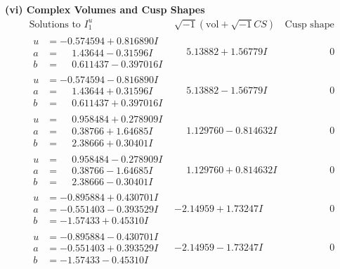 \documentclass[1p]{elsarticle_modified}
\theoremstyle{definition}
\newcommand{\I}{\sqrt{-1}}
\begin{document}
\newpage\flushleft \textbf{(vi) Complex Volumes and Cusp Shapes}
$$\begin{array}{c|c|c}  
\text{Solutions to }I^u_{1}& \I (\text{vol} + \sqrt{-1}CS) & \text{Cusp shape}\\
 \hline 
\begin{aligned}
u &= -0.574594 + 0.816890 I \\
a &= \phantom{-}1.43644 - 0.31596 I \\
b &= \phantom{-}0.611437 - 0.397016 I\end{aligned}
 & \phantom{-}5.13882 + 1.56779 I & \phantom{-0.000000 } 0 \\ \hline\begin{aligned}
u &= -0.574594 - 0.816890 I \\
a &= \phantom{-}1.43644 + 0.31596 I \\
b &= \phantom{-}0.611437 + 0.397016 I\end{aligned}
 & \phantom{-}5.13882 - 1.56779 I & \phantom{-0.000000 } 0 \\ \hline\begin{aligned}
u &= \phantom{-}0.958484 + 0.278909 I \\
a &= \phantom{-}0.38766 + 1.64685 I \\
b &= \phantom{-}2.38666 + 0.30401 I\end{aligned}
 & \phantom{-}1.129760 - 0.814632 I & \phantom{-0.000000 } 0 \\ \hline\begin{aligned}
u &= \phantom{-}0.958484 - 0.278909 I \\
a &= \phantom{-}0.38766 - 1.64685 I \\
b &= \phantom{-}2.38666 - 0.30401 I\end{aligned}
 & \phantom{-}1.129760 + 0.814632 I & \phantom{-0.000000 } 0 \\ \hline\begin{aligned}
u &= -0.895884 + 0.430701 I \\
a &= -0.551403 - 0.393529 I \\
b &= -1.57433 + 0.45310 I\end{aligned}
 & -2.14959 + 1.73247 I & \phantom{-0.000000 } 0 \\ \hline\begin{aligned}
u &= -0.895884 - 0.430701 I \\
a &= -0.551403 + 0.393529 I \\
b &= -1.57433 - 0.45310 I\end{aligned}
 & -2.14959 - 1.73247 I & \phantom{-0.000000 } 0 \\ \hline\begin{aligned}

\end{aligned}
\end{array}$$
\end{document}
